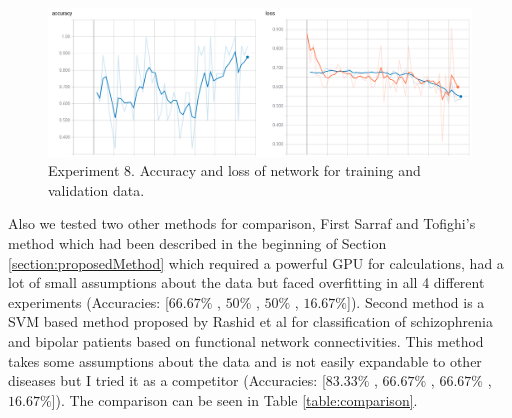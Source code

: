 \documentclass[a4paper,fleqn]{cas-dc}
\begin{document}
\begin{figure}
\includegraphics[width=\linewidth]{images/tests_8}
\caption{Experiment 8. Accuracy and loss of network for training and validation data.}
\label{fig:tests_8}
\end{figure}



Also we tested two other methods for comparison, First Sarraf and Tofighi's method \cite{Sarraf2016} which had been described in the beginning of Section \ref{section:proposedMethod} which required a powerful GPU for calculations, had a lot of small assumptions about the data but faced overfitting in all 4 different experiments (Accuracies: [$66.67\%$ , $50\%$ , $50\%$ , $16.67\%$]). Second method is a SVM based method proposed by Rashid et al \cite{Rashid2016} for classification of schizophrenia and bipolar patients based on functional network connectivities. This method takes some assumptions about the data and is not easily expandable to other diseases but I tried it as a competitor (Accuracies: [$83.33\%$ , $66.67\%$ , $66.67\%$ , $16.67\%$]). The comparison can be seen in Table \ref{table:comparison}.



\begin{table}
	\caption{Comparison of the proposed method with 2 other rivals}
	\label{table:comparison}
\end{table}
\end{document}
